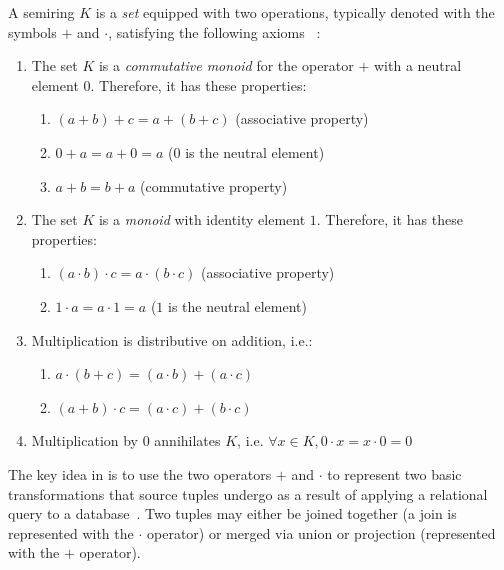 \documentclass[preprint,12pt,sort&compress]{elsarticle}
\begin{document}
A semiring $K$ is a \emph{set} equipped with two operations, typically denoted with the symbols $+$ and $\cdot$, satisfying the following axioms ~\cite[pg. 26]{berstel1985theory}:
\begin{enumerate}
	\item The set $K$ is a \emph{commutative monoid} for the operator $+$ with a neutral element $0$. Therefore, it has these properties:
		\begin{enumerate}
			\item $(a + b) + c = a + (b + c)$ (associative property)
			\item $0 + a = a + 0 = a$ ($0$ is the neutral element) 
			\item $a + b = b + a$ (commutative property)
		\end{enumerate}
	\item The set $K$ is a \emph{monoid} with identity element $1$. Therefore, it has these properties:
		\begin{enumerate}
			\item $(a \cdot b) \cdot c = a \cdot (b \cdot c)$ (associative property)
			\item $1 \cdot a = a \cdot 1 = a$ ($1$ is the neutral element)
		\end{enumerate}
	\item Multiplication is distributive on addition, i.e.:
		\begin{enumerate}
			\item $a \cdot (b + c) = (a \cdot b) + (a \cdot c)$
			\item $(a + b) \cdot c = (a \cdot c) + (b \cdot c)$
		\end{enumerate}
	\item Multiplication by $0$ annihilates $K$, i.e. $\forall x \in K, 0 \cdot x = x \cdot 0 = 0$
\end{enumerate}

The key idea in \citet{howProvenanceGreen} is to use the two operators $+$ and $\cdot$ to represent two basic transformations that source tuples undergo as a result of applying a relational query to a database~\citep{CheneyProvSurvey}. 
Two tuples may either be joined together (a join is represented with the $\cdot$ operator) or merged via union or projection (represented with the $+$ operator).
\end{document}
